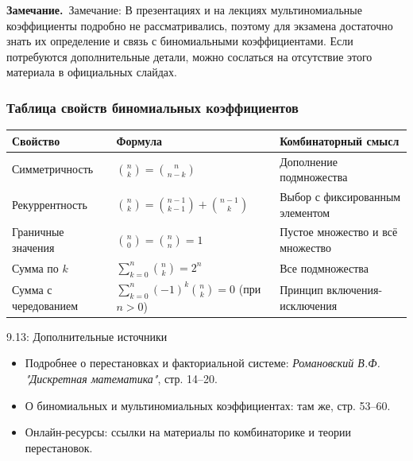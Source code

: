 \documentclass[a4paper,12pt]{article}
\newcommand{\myremark}{\textbf{Замечание.}\ }
\begin{document}
	\myremark{Замечание:} В презентациях и на лекциях мультиномиальные коэффициенты подробно не рассматривались, поэтому для экзамена достаточно знать их определение и связь с биномиальными коэффициентами. Если потребуются дополнительные детали, можно сослаться на отсутствие этого материала в официальных слайдах.
	
	\subsubsection{Таблица свойств биномиальных коэффициентов}
	
	\begin{center}
		\begin{tabular}{|l|l|l|}
			\hline
			\textbf{Свойство} & \textbf{Формула} & \textbf{Комбинаторный смысл} \\ \hline
			Симметричность & $\binom{n}{k} = \binom{n}{n-k}$ & Дополнение подмножества \\ \hline
			Рекуррентность & $\binom{n}{k} = \binom{n-1}{k-1} + \binom{n-1}{k}$ & Выбор с фиксированным элементом \\ \hline
			Граничные значения & $\binom{n}{0} = \binom{n}{n} = 1$ & Пустое множество и всё множество \\ \hline
			Сумма по $k$ & $\sum_{k=0}^n \binom{n}{k} = 2^n$ & Все подмножества \\ \hline
			Сумма с чередованием & $\sum_{k=0}^n (-1)^k \binom{n}{k} = 0$ (при $n>0$) & Принцип включения-исключения \\ \hline
		\end{tabular}
	\end{center}
	
	\begin{notebook}{9.13: Дополнительные источники}
		\begin{itemize}
			\item Подробнее о перестановках и факториальной системе: \textit{Романовский В.Ф. "Дискретная математика"}, стр. 14–20.
			\item О биномиальных и мультиномиальных коэффициентах: там же, стр. 53–60.
			\item Онлайн-ресурсы: ссылки на материалы по комбинаторике и теории перестановок.
		\end{itemize}
	\end{notebook}
		
\end{document}
